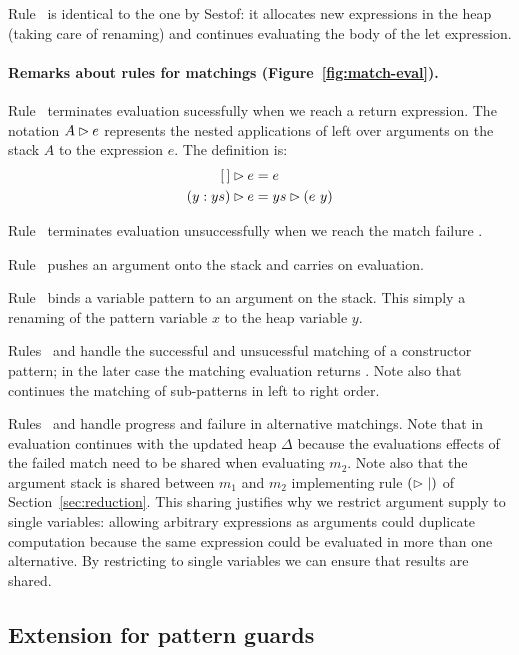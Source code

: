   Rule~ is identical to the one by Sestof: it allocates
  new expressions in the heap (taking care of renaming) and
  continues evaluating the body of the let expression.
  
  \paragraph{Remarks about rules for matchings (Figure~\ref{fig:match-eval}).}

  Rule~ terminates evaluation sucessfully
  when we reach a return expression.
  The notation $A\rhd e$ represents the nested applications
  of  left over arguments on the stack $A$ to the expression $e$. The definition is:
  \begin{align*}
  [\,]\rhd e &= e \\
  (y:ys)\rhd e  &= ys\rhd (e~y)
  \end{align*}

  Rule~ terminates evaluation unsuccessfully when
  we reach the match failure \matchfail.

  Rule~ pushes an argument onto the stack and carries
  on evaluation.
  
  Rule~ binds a variable pattern to
  an argument on the stack. This simply a renaming of the pattern
  variable $x$ to the heap variable $y$.
  
  Rules~ and  handle the successful
  and unsucessful matching of a constructor pattern; in the later
  case the matching evaluation returns \matchfail.  Note also that
   continues the matching of sub-patterns in left to
  right order.
  

  Rules~ and  handle progress and failure
  in alternative matchings.  Note that in  evaluation
  continues with the updated heap $\Delta$ because the evaluations
  effects of the failed match need to be shared when evaluating $m_2$.
  Note also that the argument stack is shared between $m_1$ and $m_2$
  implementing rule $(\rhd\mid)$ of Section~\ref{sec:reduction}.
  This sharing justifies why we restrict argument supply to single
  variables: allowing arbitrary expressions as arguments could
  duplicate computation because the same expression could be evaluated
  in more than one alternative. By restricting to single variables
  we can ensure that results are shared.
    
    
\subsection{Extension for pattern guards}\label{sec:pattern-guards}

